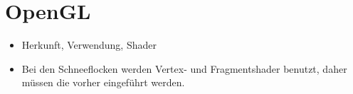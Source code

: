 \section{OpenGL}

\begin{itemize}
\item Herkunft, Verwendung, Shader
\item Bei den Schneeflocken werden Vertex- und Fragmentshader benutzt,
daher müssen die vorher eingeführt werden.
\end{itemize}